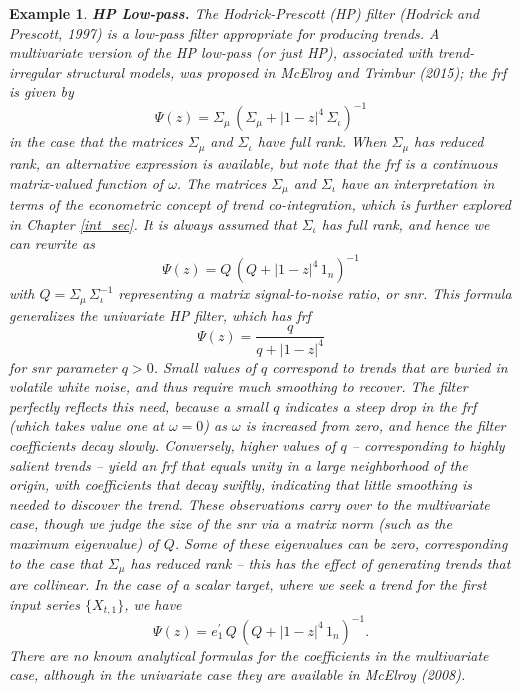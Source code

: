 \documentclass[a4paper]{book}
\newtheorem{Example}{Example}
\begin{document}
\begin{Example} {\bf HP Low-pass.} \rm
\label{exam:hp-low}
 The Hodrick-Prescott (HP) filter (Hodrick
and Prescott, 1997) is a low-pass filter appropriate for producing trends.
 A multivariate version of the HP low-pass (or just HP), 
 associated with trend-irregular structural models,
 was proposed in McElroy and Trimbur (2015); the frf is given by
\[
   \Psi (z) = \Sigma_{\mu} \, { \left( \Sigma_{\mu} + {|1 - z|}^4 \, \Sigma_{\iota} 
	\right) }^{-1}
\]
 in the case that the matrices $\Sigma_{\mu}$ and $\Sigma_{\iota}$ have full rank.  
  When $\Sigma_{\mu}$ has reduced rank, an alternative expression is available,
 but note that the frf is a continuous matrix-valued function of $\omega$.
The matrices $\Sigma_{\mu}$ and $\Sigma_{\iota}$ have an interpretation in terms
 of the econometric concept of trend co-integration, which is further explored
 in Chapter \ref{int_sec}.  It is always assumed that $\Sigma_{\iota}$ has full rank, 
 and hence  we can rewrite as
\[
  \Psi (z) = Q \, { \left( Q + {| 1 - z|}^4 \, 1_n \right) }^{-1}
\]
 with $Q = \Sigma_{\mu} \, \Sigma_{\iota}^{-1}$ representing a matrix
 {\em signal-to-noise ratio}, or snr.  This formula 
  generalizes the univariate HP filter, which has frf
\[
 \Psi (z) = \frac{ q}{ q + {| 1 - z|}^4 }
\]
 for snr parameter $q > 0$.  Small values of $q$ correspond to trends that are
 buried in volatile white noise, and thus require much smoothing to recover.
 The filter perfectly reflects this need, because a small $q$ indicates a steep
 drop in the frf (which takes value one at $\omega = 0$) as $\omega$ is increased
 from zero, and hence the filter coefficients decay slowly.  Conversely, higher values
 of $q$ -- corresponding to highly salient trends -- yield an frf that equals unity
 in a large neighborhood of the origin, with coefficients that decay swiftly,
 indicating that little smoothing is needed to discover the trend.  These observations
 carry over to the multivariate case, though we judge the size of the snr via a
 matrix norm (such as the maximum eigenvalue) of $Q$.  Some of these eigenvalues can be
 zero, corresponding to the case that $\Sigma_{\mu}$ has reduced rank -- this has the
 effect of generating trends that are collinear.  In the case of a scalar target,
 where we seek a trend for the first input series $\{ X_{t,1} \}$,  we have 
\[
  \Psi (z) = e_1^{\prime} \, Q \, { \left( Q + {| 1 - z|}^4 \, 1_n \right) }^{-1}.
\]
 There are no known analytical formulas for the coefficients in the multivariate case,
 although in the univariate case they are available in McElroy (2008).
\end{Example}
\end{document}
